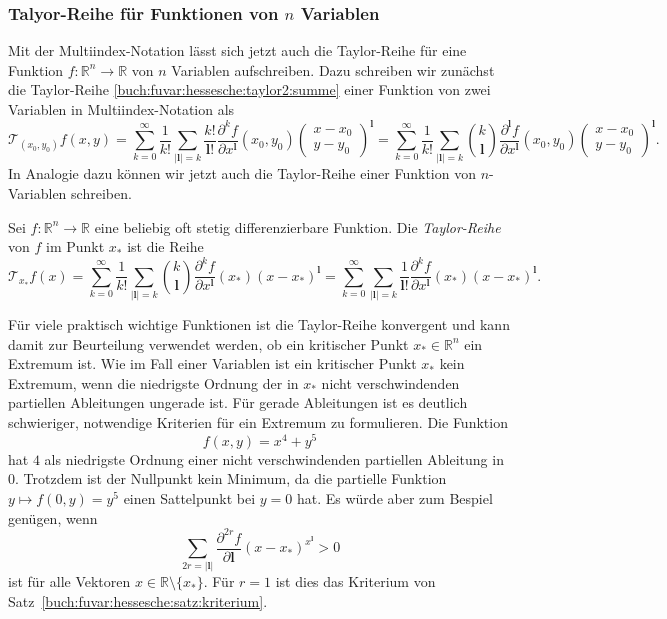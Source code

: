\subsubsection{Talyor-Reihe für Funktionen von $n$ Variablen}
Mit der Multiindex-Notation lässt sich jetzt auch die Taylor-Reihe
für eine Funktion $f\colon\mathbb{R}^n\to\mathbb{R}$ von $n$ Variablen
aufschreiben.
Dazu schreiben wir zunächst die Taylor-Reihe
\eqref{buch:fuvar:hessesche:taylor2:summe}
einer Funktion von zwei Variablen in Multiindex-Notation als
\[
\mathscr{T}_{(x_0,y_0)}f(x,y)
=
\sum_{k=0}^\infty
\frac{1}{k!}
\sum_{|\mathbf{l}|=k}
\frac{k!}{\mathbf{l}!}
\frac{\partial^k f}{\partial x^{\mathbf{l}}}
(x_0,y_0)
\begin{pmatrix}
x-x_0\\
y-y_0
\end{pmatrix}^{\mathbf{l}}
=
\sum_{k=0}^\infty
\frac{1}{k!}
\sum_{|\mathbf{l}|=k}
\binom{k}{\mathbf{l}}
\frac{\partial^{\mathbf{l}} f}{\partial x^{\mathbf{l}}}(x_0,y_0)
\begin{pmatrix}
x-x_0\\
y-y_0
\end{pmatrix}^{\mathbf{l}}.
\]
In Analogie dazu können wir jetzt auch die Taylor-Reihe einer Funktion
von $n$-Variablen schreiben.

\begin{definition}
Sei $f\colon\mathbb{R}^n\to\mathbb{R}$ eine beliebig oft stetig
differenzierbare Funktion.
Die {\em Taylor-Reihe} von $f$ im Punkt $x_*$ ist die Reihe
%
\[
\mathscr{T}_{x_*} f(x)
=
\sum_{k=0}^\infty
\frac{1}{k!}
\sum_{|\mathbf{l}|=k}
\binom{k}{\mathbf{l}}
\frac{\partial^k f}{\partial x^{\mathbf{l}}}(x_*) (x-x_*)^{\mathbf{l}}
=
\sum_{k=0}^\infty
\sum_{|\mathbf{l}|=k}
\frac{1}{\mathbf{l}!}
\frac{\partial^k f}{\partial x^{\mathbf{l}}}(x_*) (x-x_*)^{\mathbf{l}}.
\]
\end{definition}

Für viele praktisch wichtige Funktionen ist die Taylor-Reihe konvergent
und kann damit zur Beurteilung verwendet werden, ob ein kritischer Punkt
$x_*\in\mathbb{R}^n$ ein Extremum ist.
Wie im Fall einer Variablen ist ein kritischer Punkt $x_*$ kein Extremum,
wenn die niedrigste Ordnung der in $x_*$ nicht verschwindenden partiellen
Ableitungen ungerade ist.
Für gerade Ableitungen ist es deutlich schwieriger, notwendige Kriterien
für ein Extremum zu formulieren.
Die Funktion
\[
f(x,y)
=
x^4 + y^5
\]
hat $4$ als niedrigste Ordnung einer nicht verschwindenden partiellen
Ableitung in $0$.
Trotzdem ist der Nullpunkt kein Minimum, da die partielle Funktion
$y\mapsto f(0,y)=y^5$ einen Sattelpunkt bei $y=0$ hat.
Es würde aber zum Bespiel genügen, wenn
\[
\sum_{2r=|\mathbf{l}|}
\frac{\partial^{2r}f}{\partial \mathbf{l}}
(x-x_*)^{x^{\mathbf{l}}}
>
0
\]
ist für alle Vektoren $x\in\mathbb{R}\setminus\{x_*\}$.
Für $r=1$ ist dies das Kriterium von
Satz~\ref{buch:fuvar:hessesche:satz:kriterium}.



